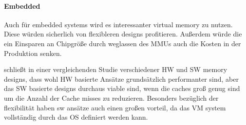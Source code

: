 \paragraph{Embedded} Auch für embedded systems wird es interessanter virtual memory zu nutzen.
Diese würden sicherlich von flexibleren designs profitieren. Außerdem würde die ein Einsparen
an Chipgröße durch weglassen des MMUs auch die Kosten in der Produktion senken. \cite{jacob1998look}


\cite{jacob1998look} schließt in einer vergleichenden Studie verschiedener HW und SW memory designs,
dass wohl HW basierte Ansätze grundsätzlich performanter sind, aber das SW basierte designs durchaus
viable sind, wenn die caches groß genug sind um die Anzahl der Cache misses zu reduzieren.
Besonders bezüglich der flexibilität haben sw ansätze auch einen großen vorteil, da das VM system
vollständig durch das OS definiert werden kann.






